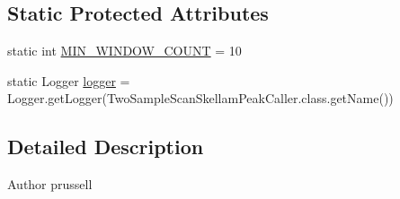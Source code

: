 \subsection*{Static Protected Attributes}
\begin{DoxyCompactItemize}
\item 
static int \hyperlink{classbroad_1_1pda_1_1seq_1_1protection_1_1_two_sample_scan_skellam_peak_caller_a83a05a92a106903b617200e58bc11e15}{M\+I\+N\+\_\+\+W\+I\+N\+D\+O\+W\+\_\+\+C\+O\+U\+N\+T} = 10
\item 
static Logger \hyperlink{classbroad_1_1pda_1_1seq_1_1protection_1_1_two_sample_scan_skellam_peak_caller_a89b166a4a5fecf9109737415c3e88bbc}{logger} = Logger.\+get\+Logger(Two\+Sample\+Scan\+Skellam\+Peak\+Caller.\+class.\+get\+Name())
\end{DoxyCompactItemize}


\subsection{Detailed Description}
\begin{DoxyAuthor}{Author}
prussell 
\end{DoxyAuthor}


